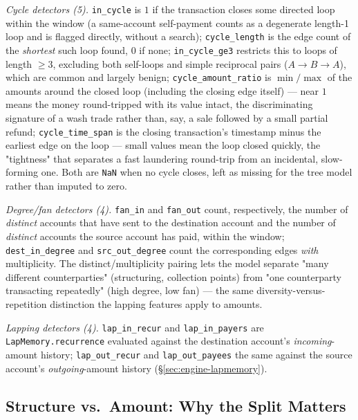 \textit{Cycle detectors (5).} \texttt{in\_cycle} is $1$ if the transaction
closes some directed loop within the window (a same-account self-payment
counts as a degenerate length-1 loop and is flagged directly, without a
search); \texttt{cycle\_length} is the edge count of the \emph{shortest} such
loop found, $0$ if none; \texttt{in\_cycle\_ge3} restricts this to loops of
length $\geq 3$, excluding both self-loops and simple reciprocal pairs
($A\to B\to A$), which are common and largely benign; \texttt{cycle\_amount\_ratio}
is $\min/\max$ of the amounts around the closed loop (including the closing
edge itself) — near $1$ means the money round-tripped with its value intact,
the discriminating signature of a wash trade rather than, say, a sale
followed by a small partial refund; \texttt{cycle\_time\_span} is the closing
transaction's timestamp minus the earliest edge on the loop — small values
mean the loop closed quickly, the "tightness" that separates a fast
laundering round-trip from an incidental, slow-forming one. Both are
\texttt{NaN} when no cycle closes, left as missing for the tree model rather
than imputed to zero.

\textit{Degree/fan detectors (4).} \texttt{fan\_in} and \texttt{fan\_out}
count, respectively, the number of \emph{distinct} accounts that have sent to
the destination account and the number of \emph{distinct} accounts the
source account has paid, within the window; \texttt{dest\_in\_degree} and
\texttt{src\_out\_degree} count the corresponding edges \emph{with}
multiplicity. The distinct/multiplicity pairing lets the model separate "many
different counterparties" (structuring, collection points) from "one
counterparty transacting repeatedly" (high degree, low fan) — the same
diversity-versus-repetition distinction the lapping features apply to
amounts.

\textit{Lapping detectors (4).} \texttt{lap\_in\_recur} and
\texttt{lap\_in\_payers} are \texttt{LapMemory.recurrence} evaluated against
the destination account's \emph{incoming}-amount history; \texttt{lap\_out\_recur}
and \texttt{lap\_out\_payees} the same against the source account's
\emph{outgoing}-amount history (\S\ref{sec:engine-lapmemory}).

\subsection{Structure vs.\ Amount: Why the Split Matters}\label{sec:engine-split}

